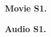 \documentclass[draft,jgrga]{agutexSI2019}
\begin{document}
\begin{article}

\noindent\textbf{Movie S1.} %


\noindent\textbf{Audio S1.} %



%
%



% 
%
%
%
%

%  




%
%
%
%
%

%
%
\end{article}
\clearpage
\end{document}
